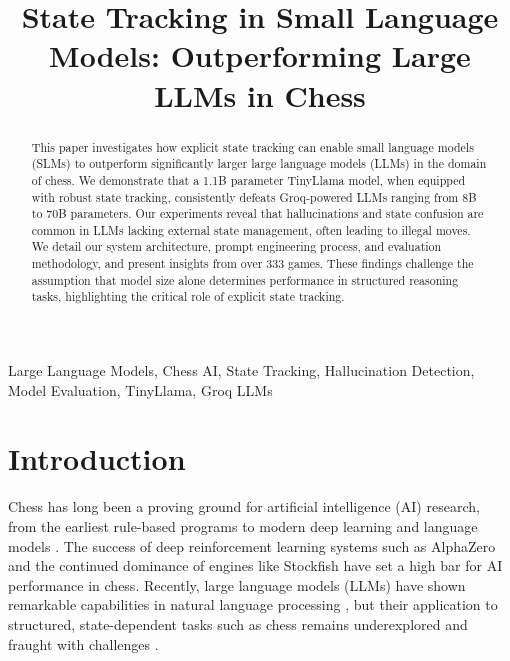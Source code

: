 \documentclass[conference]{IEEEtran}
\begin{document}
\title{State Tracking in Small Language Models: Outperforming Large LLMs in Chess}

\author{
    \and
}

\maketitle

\begin{abstract}
This paper investigates how explicit state tracking can enable small language models (SLMs) to outperform significantly larger large language models (LLMs) in the domain of chess. We demonstrate that a 1.1B parameter TinyLlama model, when equipped with robust state tracking, consistently defeats Groq-powered LLMs ranging from 8B to 70B parameters. Our experiments reveal that hallucinations and state confusion are common in LLMs lacking external state management, often leading to illegal moves. We detail our system architecture, prompt engineering process, and evaluation methodology, and present insights from over 333 games. These findings challenge the assumption that model size alone determines performance in structured reasoning tasks, highlighting the critical role of explicit state tracking.
\end{abstract}

\begin{IEEEkeywords}
Large Language Models, Chess AI, State Tracking, Hallucination Detection, Model Evaluation, TinyLlama, Groq LLMs
\end{IEEEkeywords}

\section{Introduction}
Chess has long been a proving ground for artificial intelligence (AI) research, from the earliest rule-based programs to modern deep learning and language models \cite{chess_ai_survey, chess_ai_evolution, chess_ai_benchmarks}. The success of deep reinforcement learning systems such as AlphaZero \cite{alphazero} and the continued dominance of engines like Stockfish \cite{stockfish} have set a high bar for AI performance in chess. Recently, large language models (LLMs) have shown remarkable capabilities in natural language processing \cite{llm_reasoning, llm_limitations}, but their application to structured, state-dependent tasks such as chess remains underexplored and fraught with challenges \cite{llm_chess_analysis, llm_chess_hallucination_study_1, llm_chess_hallucination_study_2}.
\end{document}
